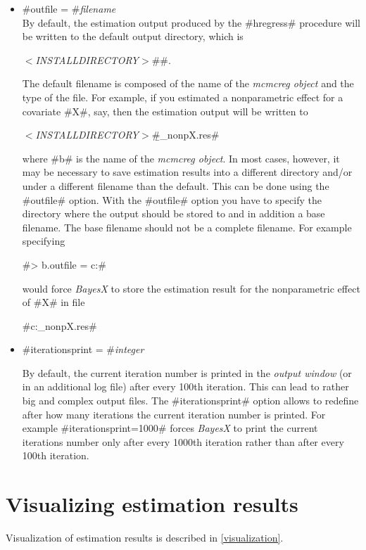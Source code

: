 \begin{itemize}
\item #outfile = #{\em filename} \\
By default, the estimation output produced by the #hregress#
procedure will be written to the default output directory, which
is

{\em $<$INSTALLDIRECTORY$>$}#\output#.

The default filename is composed of the name of the {\em mcmcreg
object} and the type of the file. For example, if you estimated a
nonparametric effect for a covariate #X#, say, then the estimation
output will be written to

{\em$<$INSTALLDIRECTORY$>$}#\output\b_nonpX.res#

where #b# is the name of the {\em mcmcreg object}. In most cases,
however, it may be necessary to save estimation results into a
different directory and/or under a different filename than the
default. This can be done using the #outfile# option. With the
#outfile# option you have to specify the directory where the
output should be stored to and in addition a base filename. The
base filename should not be a complete filename. For example
specifying

#> b.outfile = c:\data\res#

would force {\em BayesX} to store the estimation result for the
nonparametric effect of #X# in file

#c:\data\res_nonpX.res#

\item #iterationsprint = #{\em integer}

By default, the current iteration number is printed in the {\em
output window} (or in an additional log file) after every 100th
iteration. This can lead to rather big and complex output files.
The #iterationsprint# option allows to redefine after how many
iterations the current iteration number is printed. For example
#iterationsprint=1000# forces {\em BayesX} to print the current
iterations number only after every 1000th iteration rather than
after every 100th iteration.
\end{itemize}

\section{Visualizing estimation results}

Visualization of estimation results is described in
\autoref{visualization}.
